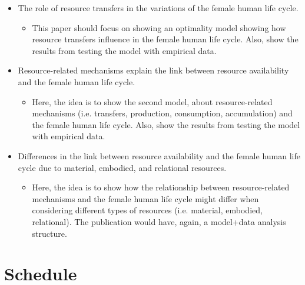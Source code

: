\documentclass{article}
\begin{document}
\begin{itemize}
    \item The role of resource transfers in the variations of the female human life cycle.
    \begin{itemize}
        \item This paper should focus on showing an optimality model showing how resource transfers influence in the female human life cycle. Also, show the results from testing the model with empirical data.
    \end{itemize}
    \item Resource-related mechanisms explain the link between resource availability and the female human life cycle.
    \begin{itemize}
        \item Here, the idea is to show the second model, about resource-related mechanisms (i.e. transfers, production, consumption, accumulation) and the female human life cycle. Also, show the results from testing the model with empirical data.
    \end{itemize}
    \item Differences in the link between resource availability and the female human life cycle due to material, embodied, and relational resources.
    \begin{itemize}
        \item Here, the idea is to show how the relationship between resource-related mechanisms and the female human life cycle might differ when considering different types of resources (i.e. material, embodied, relational). The publication would have, again, a model+data analysis structure.
    \end{itemize}
\end{itemize}

\section{Schedule}
\end{document}
